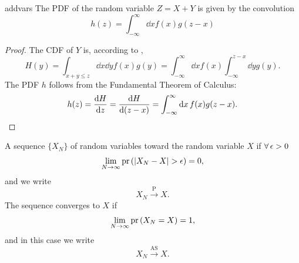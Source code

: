 \begin{proposition}{}{addvars}
  The PDF of the random variable $Z=X+Y$ is given by the convolution
  \begin{equation*}
    h(z)=\int_{-\infty}^\infty\dd{x}f(x)g(z-x)
  \end{equation*}
  \begin{proof}
    The CDF of $Y$ is, according to ,
    \begin{equation*}
      H(y)=\int_{x+y\leq z}\dd{x}\dd{y}f(x)g(y)
          =\int_{-\infty}^\infty\dd{x}f(x)\int_{-\infty}^{z-x}
            \dd{y}g(y).
    \end{equation*}
    The PDF $h$ follows from the Fundamental Theorem of Calculus:
    \begin{equation*}
      h(z)=\dv{H}{z}=\dv{H}{(z-x)}
          =\int_{-\infty}^\infty\dd{x}f(x)g(z-x).
    \end{equation*}
  \end{proof}
\end{proposition}

A sequence $\{X_N\}$ of random variables 
toward the random variable $X$ if $\operatorname{\forall}\epsilon>0$ 
\begin{equation}
  \lim_{N\to\infty}\pr{|X_N-X|>\epsilon}=0,
\end{equation}
and we write
\begin{equation}
  X_N\xrightarrow{\text{P}}X.
\end{equation}
The sequence converges to $X$ 
 if
\begin{equation}
  \lim_{N\to\infty}\operatorname{pr}\left(X_N=X\right)=1,
\end{equation}
and in this case we write
\begin{equation}
  X_N\xrightarrow{\text{AS}}X.
\end{equation}

